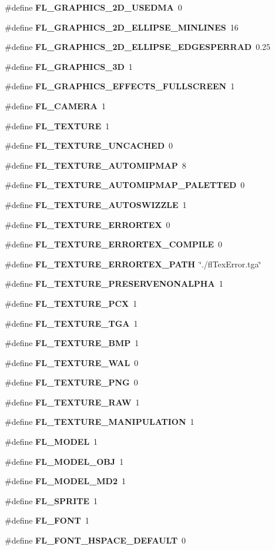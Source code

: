 \begin{CompactItemize}
\item 
\#define {\bf FL\_\-GRAPHICS\_\-2D\_\-USEDMA}~0
\item 
\#define {\bf FL\_\-GRAPHICS\_\-2D\_\-ELLIPSE\_\-MINLINES}~16
\item 
\#define {\bf FL\_\-GRAPHICS\_\-2D\_\-ELLIPSE\_\-EDGESPERRAD}~0.25
\item 
\#define {\bf FL\_\-GRAPHICS\_\-3D}~1
\item 
\#define {\bf FL\_\-GRAPHICS\_\-EFFECTS\_\-FULLSCREEN}~1
\item 
\#define {\bf FL\_\-CAMERA}~1
\item 
\#define {\bf FL\_\-TEXTURE}~1
\item 
\#define {\bf FL\_\-TEXTURE\_\-UNCACHED}~0
\item 
\#define {\bf FL\_\-TEXTURE\_\-AUTOMIPMAP}~8
\item 
\#define {\bf FL\_\-TEXTURE\_\-AUTOMIPMAP\_\-PALETTED}~0
\item 
\#define {\bf FL\_\-TEXTURE\_\-AUTOSWIZZLE}~1
\item 
\#define {\bf FL\_\-TEXTURE\_\-ERRORTEX}~0
\item 
\#define {\bf FL\_\-TEXTURE\_\-ERRORTEX\_\-COMPILE}~0
\item 
\#define {\bf FL\_\-TEXTURE\_\-ERRORTEX\_\-PATH}~\char`\"{}./fl\-Tex\-Error.tga\char`\"{}
\item 
\#define {\bf FL\_\-TEXTURE\_\-PRESERVENONALPHA}~1
\item 
\#define {\bf FL\_\-TEXTURE\_\-PCX}~1
\item 
\#define {\bf FL\_\-TEXTURE\_\-TGA}~1
\item 
\#define {\bf FL\_\-TEXTURE\_\-BMP}~1
\item 
\#define {\bf FL\_\-TEXTURE\_\-WAL}~0
\item 
\#define {\bf FL\_\-TEXTURE\_\-PNG}~0
\item 
\#define {\bf FL\_\-TEXTURE\_\-RAW}~1
\item 
\#define {\bf FL\_\-TEXTURE\_\-MANIPULATION}~1
\item 
\#define {\bf FL\_\-MODEL}~1
\item 
\#define {\bf FL\_\-MODEL\_\-OBJ}~1
\item 
\#define {\bf FL\_\-MODEL\_\-MD2}~1
\item 
\#define {\bf FL\_\-SPRITE}~1
\item 
\#define {\bf FL\_\-FONT}~1
\item 
\#define {\bf FL\_\-FONT\_\-HSPACE\_\-DEFAULT}~0
\item 

\end{CompactItemize}
